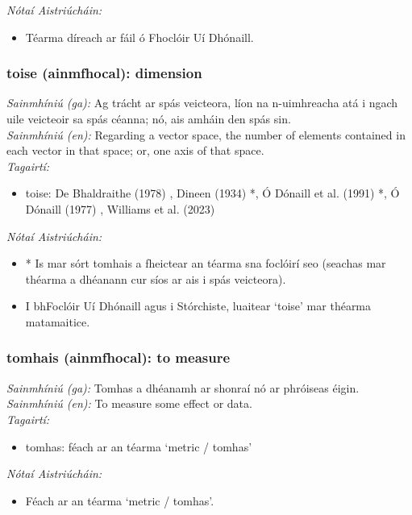  \noindent \textit{Nótaí Aistriúcháin:}
\begin{itemize}
	\item Téarma díreach ar fáil ó Fhoclóir Uí Dhónaill.
\end{itemize}


\subsubsection*{toise (ainmfhocal): dimension}
 \noindent \textit{Sainmhíniú (ga):} Ag trácht ar spás veicteora, líon na n-uimhreacha atá i ngach uile veicteoir sa spás céanna; nó, ais amháin den spás sin.
\\
 \noindent \textit{Sainmhíniú (en):} Regarding a vector space, the number of elements contained in each vector in that space; or, one axis of that space.
\\
 \noindent \textit{Tagairtí:}
\begin{itemize}
	\item toise: De Bhaldraithe (1978) \cite{de-bhaldraithe}, Dineen (1934) \cite{dineen}*, Ó Dónaill et al. (1991) \cite{focloir-beag}*, Ó Dónaill (1977) \cite{odonaill}, Williams et al. (2023) \cite{storchiste}
\end{itemize}

 \noindent \textit{Nótaí Aistriúcháin:}
\begin{itemize}
	\item * Is mar sórt tomhais a fheictear an téarma sna foclóirí seo (seachas mar théarma a dhéanann cur síos ar ais i spás veicteora).
	\item I bhFoclóir Uí Dhónaill agus i Stórchiste, luaitear `toise' mar théarma matamaitice.
\end{itemize}


\subsubsection*{tomhais (ainmfhocal): to measure}
 \noindent \textit{Sainmhíniú (ga):} Tomhas a dhéanamh ar shonraí nó ar phróiseas éigin.
\\
 \noindent \textit{Sainmhíniú (en):} To measure some effect or data.
\\
 \noindent \textit{Tagairtí:}
\begin{itemize}
	\item tomhas: féach ar an téarma `metric / tomhas'
\end{itemize}

 \noindent \textit{Nótaí Aistriúcháin:}
\begin{itemize}
	\item Féach ar an téarma `metric / tomhas'.
\end{itemize}


